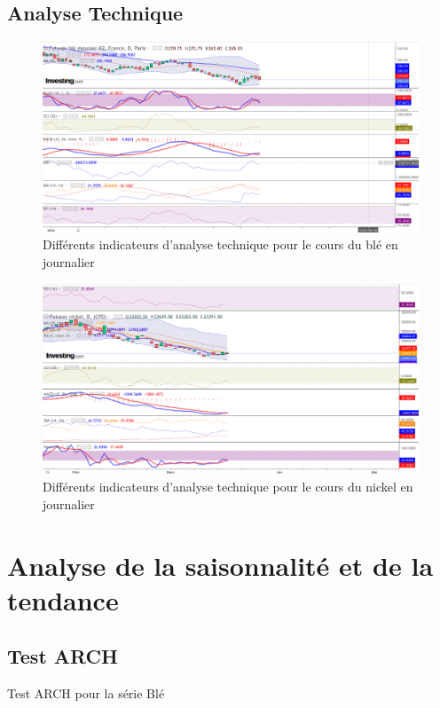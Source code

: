 \documentclass[12pt,a4paper]{article}
\begin{document}
\subsection{Analyse Technique}\label{appendix:at}
\begin{figure}[H]
    \centering
    \includegraphics[width=\textwidth]{1_2_at_ble.png}
    \caption{Différents indicateurs d'analyse technique pour le cours du blé en journalier}
\end{figure}

\begin{figure}[H]
    \centering
    \includegraphics[width=\textwidth]{1_2_at_nickel.png}
    \caption{Différents indicateurs d'analyse technique pour le cours du nickel en journalier}
\end{figure}


\section{Analyse de la saisonnalité et de la tendance}
\setcounter{table}{0}
\setcounter{figure}{0}
\subsection{Test ARCH}\label{appendix:arch_test}
\begin{table}[H]
    \centering
    \caption{Test ARCH pour la série Blé}
    \label{tab:hetero_ble}
    \sffamily
    
\end{table}
\end{document}
